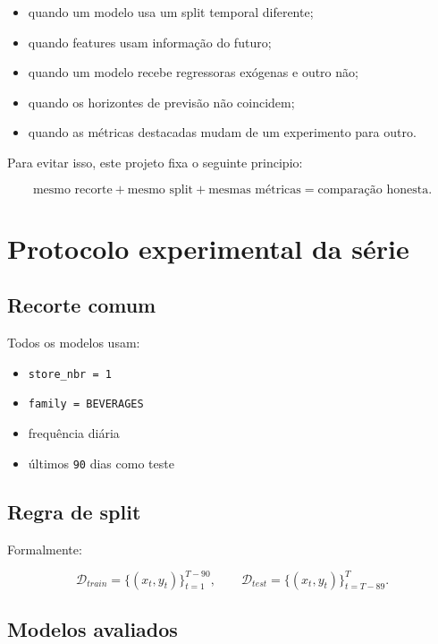 \documentclass[12pt]{article}
\providecommand{\tightlist}{%
              \setlength{\itemsep}{0pt}\setlength{\parskip}{0pt}}
\begin{document}
\begin{itemize}
\tightlist
\item
  quando um modelo usa um split temporal diferente;
\item
  quando features usam informação do futuro;
\item
  quando um modelo recebe regressoras exógenas e outro não;
\item
  quando os horizontes de previsão não coincidem;
\item
  quando as métricas destacadas mudam de um experimento para outro.
\end{itemize}

Para evitar isso, este projeto fixa o seguinte principio:

\[
\text{mesmo recorte} + \text{mesmo split} + \text{mesmas métricas} = \text{comparação honesta}.
\]

\section{Protocolo experimental da série}\label{3-protocolo-experimental-da-suxe9rie}

\subsection{Recorte comum}\label{31-recorte-comum}

Todos os modelos usam:

\begin{itemize}
\tightlist
\item
  \texttt{store\_nbr\ =\ 1}
\item
  \texttt{family\ =\ BEVERAGES}
\item
  frequência diária
\item
  últimos \texttt{90} dias como teste
\end{itemize}

\subsection{Regra de split}\label{32-regra-de-split}

Formalmente:

\[
\mathcal{D}_{train} = \{(x_t, y_t)\}_{t=1}^{T-90},
\qquad
\mathcal{D}_{test} = \{(x_t, y_t)\}_{t=T-89}^T.
\]

\subsection{Modelos avaliados}\label{33-modelos-avaliados}
\end{document}
